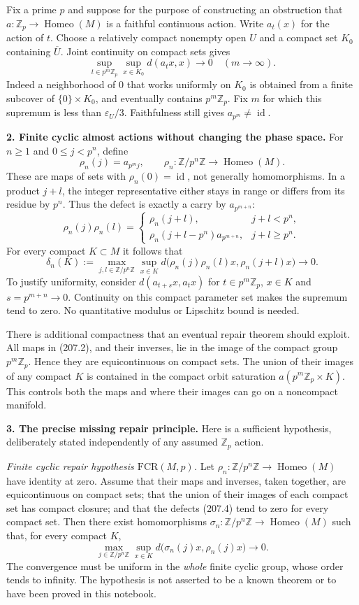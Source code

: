 \documentclass[11pt,a4paper]{article}
\newcommand{\Z}{\mathbb{Z}}
\begin{document}
Fix a prime $p$ and suppose for the purpose of constructing an obstruction
that $a:\Z_p\to\operatorname{Homeo}(M)$ is a faithful continuous action.
Write $a_t(x)$ for the action of $t$. Choose a relatively compact nonempty
open $U$ and a compact set $K_0$ containing $\overline U$. Joint continuity
on compact sets gives
\[
 \sup_{t\in p^m\Z_p}\sup_{x\in K_0}d(a_t x,x)\longrightarrow0
 \quad(m\to\infty). \tag{207.1}
\]
Indeed a neighborhood of $0$ that works uniformly on $K_0$ is obtained
from a finite subcover of $\{0\}\times K_0$, and eventually contains
$p^m\Z_p$. Fix $m$ for which this supremum is less than
$\varepsilon_U/3$. Faithfulness still gives $a_{p^m}\ne\operatorname{id}$.

\textbf{2. Finite cyclic almost actions without changing the phase space.}
For $n\ge1$ and $0\le j<p^n$, define
\[
 \rho_n(j)=a_{p^m j},\qquad
 \rho_n:\Z/p^n\Z\longrightarrow\operatorname{Homeo}(M).
 \tag{207.2}
\]
These are maps of sets with $\rho_n(0)=\operatorname{id}$, not generally
homomorphisms. In a product $j+l$, the integer representative either
stays in range or differs from its residue by $p^n$. Thus the defect is
exactly a carry by $a_{p^{m+n}}$:
\[
 \rho_n(j)\rho_n(l)=
 \begin{cases}
  \rho_n(j+l),&j+l<p^n,\\
  \rho_n(j+l-p^n)a_{p^{m+n}},&j+l\ge p^n.
 \end{cases} \tag{207.3}
\]
For every compact $K\subset M$ it follows that
\[
 \delta_n(K):=
 \max_{j,l\in\Z/p^n\Z}\sup_{x\in K}
 d\bigl(\rho_n(j)\rho_n(l)x,\rho_n(j+l)x\bigr)
 \longrightarrow0. \tag{207.4}
\]
To justify uniformity, consider
$d(a_{t+s}x,a_t x)$ for $t\in p^m\Z_p$, $x\in K$ and
$s=p^{m+n}\to0$. Continuity on this compact parameter set makes the
supremum tend to zero. No quantitative modulus or Lipschitz bound is
needed.

There is additional compactness that an eventual repair theorem should
exploit. All maps in (207.2), and their inverses, lie in the image of the
compact group $p^m\Z_p$. Hence they are equicontinuous on compact sets.
The union of their images of any compact $K$ is contained in the compact
orbit saturation $a(p^m\Z_p\times K)$. This controls both the maps and
where their images can go on a noncompact manifold.

\textbf{3. The precise missing repair principle.}
Here is a sufficient hypothesis, deliberately stated independently of
any assumed $\Z_p$ action.

\emph{Finite cyclic repair hypothesis $\mathrm{FCR}(M,p)$.}
Let $\rho_n:\Z/p^n\Z\to\operatorname{Homeo}(M)$ have identity at zero.
Assume that their maps and inverses, taken together, are equicontinuous
on compact sets; that the union of their images of each compact set has
compact closure; and that the defects (207.4) tend to zero for every
compact set. Then there exist homomorphisms
$\sigma_n:\Z/p^n\Z\to\operatorname{Homeo}(M)$ such that, for every
compact $K$,
\[
 \max_{j\in\Z/p^n\Z}\sup_{x\in K}
 d\bigl(\sigma_n(j)x,\rho_n(j)x\bigr)\longrightarrow0.
 \tag{207.5}
\]
The convergence must be uniform in the \emph{whole} finite cyclic group,
whose order tends to infinity. The hypothesis is not asserted to be a
known theorem or to have been proved in this notebook.
\end{document}
